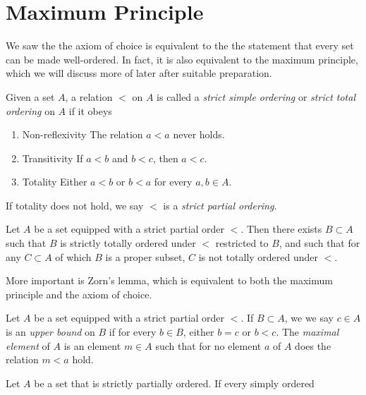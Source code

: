\section{Maximum Principle}
We saw the the axiom of choice is equivalent to the the statement that
every set can be made well-ordered. In fact, it is also equivalent to the
maximum principle, which we will discuss more of later after suitable
preparation.
\begin{definition}
	Given a set $A$, a relation $<$ on $A$ is called a \emph{strict simple ordering}
	or \emph{strict total ordering}
	on $A$ if it obeys 
	\begin{enumerate}
		\item{Non-reflexivity} The relation $a < a$ never holds.
		\item{Transitivity} If $a < b$ and $b < c$, then $a < c$.
		\item{Totality} Either $a < b$ or $b < a$ for every $a,b \in A$.  
	\end{enumerate}
	If totality does not hold, we say $<$ is a \emph{strict partial ordering}.
\end{definition}
\begin{theorem}
	Let $A$ be a set equipped with a strict partial order $<$. Then there exists
	$B \subset A$ such that $B$ is strictly totally ordered under $<$ restricted
	to $B$, and such that for any $C \subset A$ of which $B$ is a proper subset,
	$C$ is not totally ordered under $<$.
\end{theorem}
More important is Zorn's lemma, which is equivalent to both the maximum
principle and the axiom of choice.
\begin{definition}
	\label{def:zorn-def}
	Let $A$ be a set equipped with a strict partial order $<$. If $B \subset A$,
	we we say $c \in A$ is an \emph{upper bound} on $B$ if for every $b \in B$,
	either $b = c$ or $b < c$. The \emph{maximal element} of $A$ is an element
	$m \in A$ such that for no element $a$ of $A$ does the relation $m < a$ hold.
\end{definition}
\begin{theorem}
	Let $A$ be a set that is strictly partially ordered. If every simply ordered
\end{theorem}

